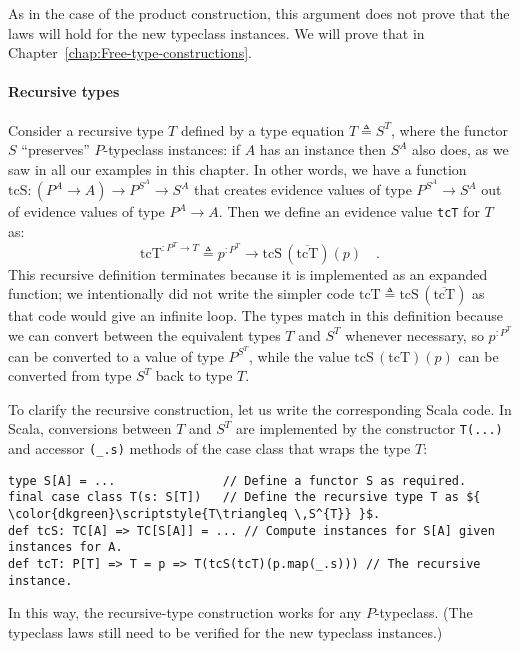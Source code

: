 As in the case of the product construction, this argument does not
prove that the laws will hold for the new typeclass instances. We
will prove that in Chapter~\ref{chap:Free-type-constructions}.

\paragraph{Recursive types}

Consider a recursive type $T$ defined by a type equation $T\triangleq S^{T}$,
where the functor $S$ \textsf{``}preserves\textsf{''} $P$-typeclass instances: if
$A$ has an instance then $S^{A}$ also does, as we saw in all our
examples in this chapter. In other words, we have a function $\text{tcS}:(P^{A}\rightarrow A)\rightarrow P^{S^{A}}\rightarrow S^{A}$
that creates evidence values of type $P^{S^{A}}\rightarrow S^{A}$
out of evidence values of type $P^{A}\rightarrow A$. Then we define
an evidence value \lstinline!tcT! for $T$ as:
\[
\text{tcT}^{:P^{T}\rightarrow T}\triangleq p^{:P^{T}}\rightarrow\text{tcS}\,(\overline{\text{tcT}})(p)\quad.
\]
This recursive definition terminates because it is implemented as
an expanded function; we intentionally did not write the simpler code
$\text{tcT}\triangleq\text{tcS}\,(\overline{\text{tcT}})$ as that
code would give an infinite loop. The types match in this definition
because we can convert between the equivalent types $T$ and $S^{T}$
whenever necessary, so $p^{:P^{T}}$ can be converted to a value of
type $P^{S^{T}}$, while the value $\text{tcS}\,(\text{tcT})(p)$
can be converted from type $S^{T}$ back to type $T$.

To clarify the recursive construction, let us write the corresponding
Scala code. In Scala, conversions between $T$ and $S^{T}$ are implemented
by the constructor \lstinline!T(...)! and accessor \lstinline!(_.s)!
methods of the case class that wraps the type $T$:
\begin{lstlisting}[mathescape=true]
type S[A] = ...               // Define a functor S as required.
final case class T(s: S[T])   // Define the recursive type T as ${ \color{dkgreen}\scriptstyle{T\triangleq \,S^{T}} }$.
def tcS: TC[A] => TC[S[A]] = ... // Compute instances for S[A] given instances for A.
def tcT: P[T] => T = p => T(tcS(tcT)(p.map(_.s))) // The recursive instance.
\end{lstlisting}
In this way, the recursive-type construction works for any $P$-typeclass.
(The typeclass laws still need to be verified for the new typeclass
instances.)

